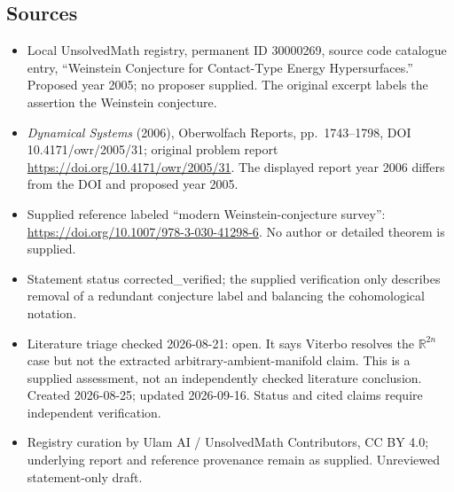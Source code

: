 \documentclass[11pt]{article}
\newcommand{\R}{\mathbb{R}}
\begin{document}
\subsection{Sources}
\begin{itemize}
\item Local UnsolvedMath registry, permanent ID 30000269, source code catalogue entry, ``Weinstein Conjecture for Contact-Type Energy Hypersurfaces.'' Proposed year 2005; no proposer supplied. The original excerpt labels the assertion the Weinstein conjecture.
\item \emph{Dynamical Systems} (2006), Oberwolfach Reports, pp.\ 1743--1798, DOI 10.4171/owr/2005/31; original problem report \url{https://doi.org/10.4171/owr/2005/31}. The displayed report year 2006 differs from the DOI and proposed year 2005.
\item Supplied reference labeled ``modern Weinstein-conjecture survey'': \url{https://doi.org/10.1007/978-3-030-41298-6}. No author or detailed theorem is supplied.
\item Statement status corrected\_verified; the supplied verification only describes removal of a redundant conjecture label and balancing the cohomological notation.
\item Literature triage checked 2026-08-21: open. It says Viterbo resolves the $\R^{2n}$ case but not the extracted arbitrary-ambient-manifold claim. This is a supplied assessment, not an independently checked literature conclusion. Created 2026-08-25; updated 2026-09-16. Status and cited claims require independent verification.
\item Registry curation by Ulam AI / UnsolvedMath Contributors, CC BY 4.0; underlying report and reference provenance remain as supplied. Unreviewed statement-only draft.
\end{itemize}
\end{document}
